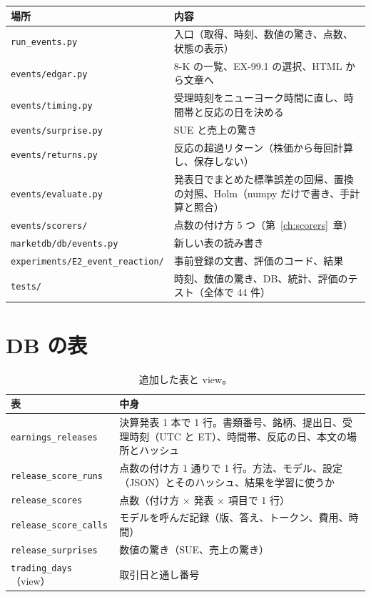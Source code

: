 \documentclass[xelatex,ja=standard,jafont=haranoaji,a4paper,10pt]{bxjsreport}
\newcommand{\code}[1]{\texttt{#1}}
\newcommand{\chapref}[1]{第~\ref{#1}~章}
\begin{document}
\begin{longtable}{p{4.6cm}p{9.6cm}}
\toprule
\textbf{場所} & \textbf{内容} \\
\midrule
\endfirsthead
\bottomrule
\endfoot
\code{run\_events.py} & 入口（取得、時刻、数値の驚き、点数、状態の表示） \\
\code{events/edgar.py} & 8-K の一覧、EX-99.1 の選択、HTML から文章へ \\
\code{events/timing.py} & 受理時刻をニューヨーク時間に直し、時間帯と反応の日を決める \\
\code{events/surprise.py} & SUE と売上の驚き \\
\code{events/returns.py} & 反応の超過リターン（株価から毎回計算し、保存しない） \\
\code{events/evaluate.py} & 発表日でまとめた標準誤差の回帰、置換の対照、Holm（numpy だけで書き、手計算と照合） \\
\code{events/scorers/} & 点数の付け方 5 つ（\chapref{ch:scorers}） \\
\code{marketdb/db/events.py} & 新しい表の読み書き \\
\code{experiments/E2\_event\_}\newline\code{reaction/} & 事前登録の文書、評価のコード、結果 \\
\code{tests/} & 時刻、数値の驚き、DB、統計、評価のテスト（全体で 44 件） \\
\end{longtable}

\section{DB の表}

\begin{table}[H]
\centering
\caption{追加した表と view。}
\small
\begin{tabular}{lp{10.2cm}}
\toprule
表 & 中身 \\
\midrule
\code{earnings\_releases} & 決算発表 1 本で 1 行。書類番号、銘柄、提出日、受理時刻（UTC と ET）、時間帯、反応の日、本文の場所とハッシュ \\
\code{release\_score\_runs} & 点数の付け方 1 通りで 1 行。方法、モデル、設定（JSON）とそのハッシュ、結果を学習に使うか \\
\code{release\_scores} & 点数（付け方 × 発表 × 項目で 1 行） \\
\code{release\_score\_calls} & モデルを呼んだ記録（版、答え、トークン、費用、時間） \\
\code{release\_surprises} & 数値の驚き（SUE、売上の驚き） \\
\code{trading\_days}（view） & 取引日と通し番号 \\
\bottomrule
\end{tabular}
\end{table}
\end{document}
